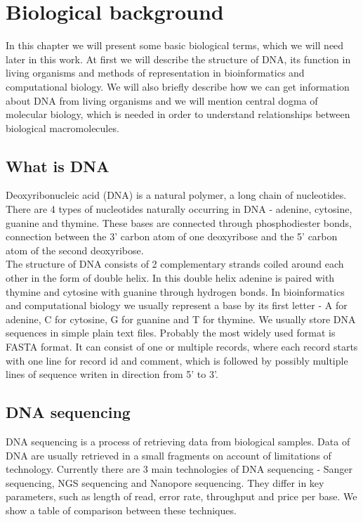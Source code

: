\chapter{Biological background}
In this chapter we will present some basic biological terms, which we will need later in this work.
At first we will describe the structure of DNA, its function in living organisms
and methods of representation in bioinformatics and computational biology.
We will also briefly describe how we can get information about DNA from living organisms and we will mention central dogma of molecular biology, which is needed in order to understand relationships between biological macromolecules.

\section{What is DNA}
Deoxyribonucleic acid (DNA) is a natural polymer, a long chain of nucleotides. There are 4 types of nucleotides
naturally occurring in DNA - adenine, cytosine, guanine and thymine. These bases are connected through phosphodiester bonds,
connection between the 3' carbon atom of one deoxyribose and the 5' carbon atom of the second deoxyribose. \\
The structure of DNA consists of 2 complementary strands coiled around each other in the form of double helix.
In this double helix adenine is paired with thymine and cytosine with guanine through hydrogen bonds.
In bioinformatics and computational biology we usually represent a base by its first letter - A for adenine, C for cytosine, G for guanine and T for thymine.
We usually store DNA sequences in simple plain text files. Probably the most widely used format is FASTA format.
It can consist of one or multiple records, where each record starts with one line for record id and comment, which is followed by possibly multiple lines of sequence writen in direction from 5' to 3'.

\section{DNA sequencing}
DNA sequencing is a process of retrieving data from biological samples.
Data of DNA are usually retrieved in a small fragments on account of limitations of technology.
Currently there are 3 main technologies of DNA sequencing - Sanger sequencing, NGS sequencing and Nanopore sequencing.
They differ in key parameters, such as length of read, error rate, throughput and price per base.
We show a table of comparison between these techniques.

